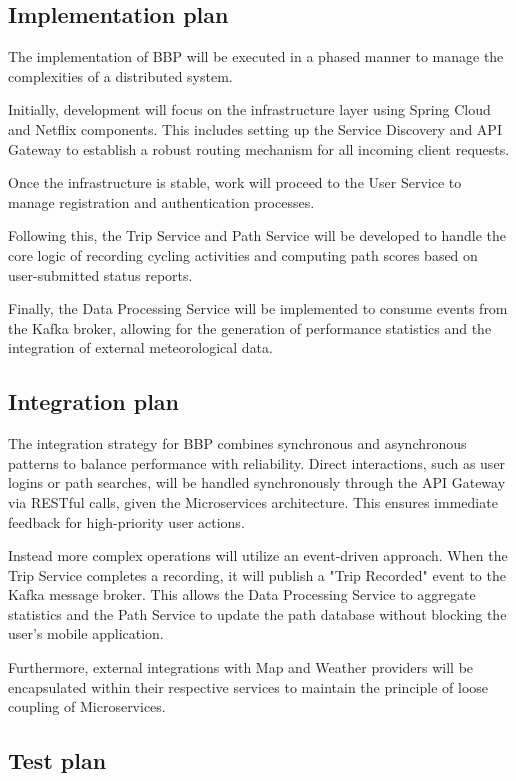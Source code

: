\subsection{Implementation plan}

The implementation of BBP will be executed in a phased manner to manage the complexities of a distributed system. 

Initially, development will focus on the infrastructure layer using Spring Cloud and Netflix components. 
This includes setting up the Service Discovery and API Gateway to establish a robust routing mechanism for all incoming client requests.

Once the infrastructure is stable, work will proceed to the User Service to manage registration and authentication processes. 

Following this, the Trip Service and Path Service will be developed to handle the core logic of recording cycling activities and computing path scores based on user-submitted status reports. 

Finally, the Data Processing Service will be implemented to consume events from the Kafka broker, allowing for the generation of performance statistics and the integration of external meteorological data.

\subsection{Integration plan}

The integration strategy for BBP combines synchronous and asynchronous patterns to balance performance with reliability. Direct interactions, such as user logins or path searches, will be handled synchronously through the API Gateway via RESTful calls, given the Microservices architecture. This ensures immediate feedback for high-priority user actions.

Instead more complex operations will utilize an event-driven approach. When the Trip Service completes a recording, it will publish a "Trip Recorded" event to the Kafka message broker. This allows the Data Processing Service to aggregate statistics and the Path Service to update the path database without blocking the user's mobile application. 

Furthermore, external integrations with Map and Weather providers will be encapsulated within their respective services to maintain the principle of loose coupling of Microservices. 

\subsection{Test plan}

